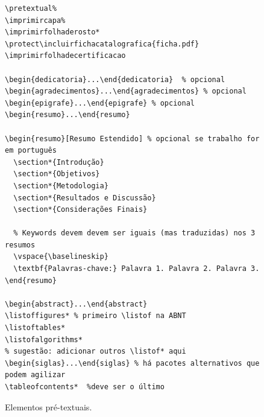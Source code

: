 \documentclass[embeddedlogo]{../ufsc-thesis-rn46-2019}
\begin{document}
\begin{figure}[tb]
  \centering
  \caption{Elementos pré-textuais.}
  \label{fig:pre}
  \begin{verbatim}
\pretextual%
\imprimircapa%
\imprimirfolhaderosto*
\protect\incluirfichacatalografica{ficha.pdf}
\imprimirfolhadecertificacao

\begin{dedicatoria}...\end{dedicatoria}  % opcional
\begin{agradecimentos}...\end{agradecimentos} % opcional
\begin{epigrafe}...\end{epigrafe} % opcional
\begin{resumo}...\end{resumo} 

\begin{resumo}[Resumo Estendido] % opcional se trabalho for em português
  \section*{Introdução}
  \section*{Objetivos} 
  \section*{Metodologia} 
  \section*{Resultados e Discussão} 
  \section*{Considerações Finais} 

  % Keywords devem devem ser iguais (mas traduzidas) nos 3 resumos  
  \vspace{\baselineskip}
  \textbf{Palavras-chave:} Palavra 1. Palavra 2. Palavra 3. 
\end{resumo}

\begin{abstract}...\end{abstract}
\listoffigures* % primeiro \listof na ABNT
\listoftables*  
\listofalgorithms*
% sugestão: adicionar outros \listof* aqui
\begin{siglas}...\end{siglas} % há pacotes alternativos que podem agilizar
\tableofcontents*  %deve ser o último
  \end{verbatim}
\end{figure}
\end{document}
